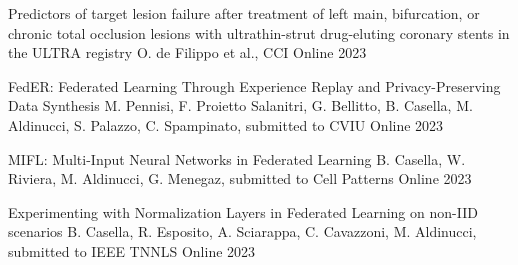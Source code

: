 \begin{cvhonors}


  \cvhonor
    {Predictors of target lesion failure after treatment of left main, bifurcation, or chronic total occlusion lesions with ultrathin-strut drug-eluting coronary stents in the ULTRA registry} %
    {O. de Filippo et al., CCI} %
    {Online} %
    {2023} %

  \cvhonor
    {FedER: Federated Learning Through Experience Replay and Privacy-Preserving Data Synthesis} %
    {M. Pennisi, F. Proietto Salanitri, G. Bellitto, B. Casella, M. Aldinucci, S. Palazzo, C. Spampinato, submitted to CVIU} %
    {Online} %
    {2023} %

  \cvhonor
    {MIFL: Multi-Input Neural Networks in Federated Learning} %
    {B. Casella, W. Riviera, M. Aldinucci, G. Menegaz, submitted to Cell Patterns} %
    {Online} %
    {2023} %

  \cvhonor
    {Experimenting with Normalization Layers in Federated Learning on non-IID scenarios} %
    {B. Casella, R. Esposito, A. Sciarappa, C. Cavazzoni, M. Aldinucci, submitted to IEEE TNNLS} %
    {Online} %
    {2023} %

\end{cvhonors}


